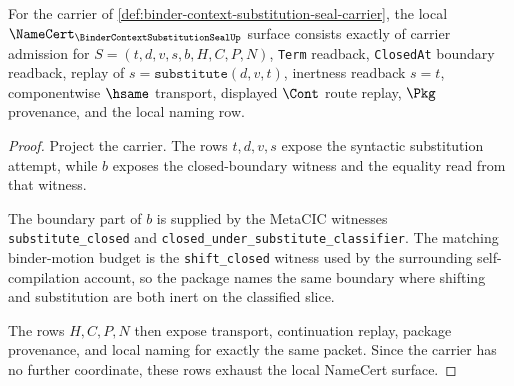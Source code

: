 \begin{theorem}
\label{thm:binder-context-substitution-seal-namecert-obligations}
For the carrier of \autoref{def:binder-context-substitution-seal-carrier}, the local $\NameCert_{\BinderContextSubstitutionSealUp}$ surface consists exactly of carrier admission for $S=(t,d,v,s,b,H,C,P,N)$, \texttt{Term} readback, \texttt{ClosedAt} boundary readback, replay of $s=\texttt{substitute}(d,v,t)$, inertness readback $s=t$, componentwise $\hsame$ transport, displayed $\Cont$ route replay, $\Pkg$ provenance, and the local naming row.
\end{theorem}
\begin{proof}
Project the carrier. The rows $t,d,v,s$ expose the syntactic substitution attempt, while $b$ exposes the closed-boundary witness and the equality read from that witness.

The boundary part of $b$ is supplied by the MetaCIC witnesses \texttt{substitute\_closed} and \texttt{closed\_under\_substitute\_classifier}. The matching binder-motion budget is the \texttt{shift\_closed} witness used by the surrounding self-compilation account, so the package names the same boundary where shifting and substitution are both inert on the classified slice.

The rows $H,C,P,N$ then expose transport, continuation replay, package provenance, and local naming for exactly the same packet. Since the carrier has no further coordinate, these rows exhaust the local NameCert surface.
\end{proof}

